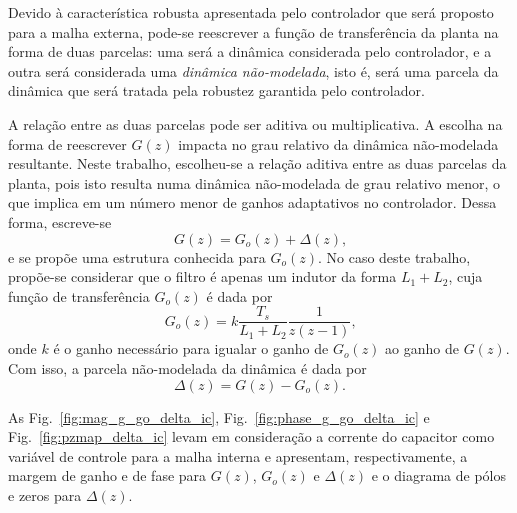   Devido à característica robusta apresentada pelo controlador que será proposto para a malha externa, pode-se reescrever a função de transferência da planta na forma de duas parcelas: uma será a dinâmica considerada pelo controlador, e a outra será considerada uma \emph{dinâmica não-modelada}, isto é, será uma parcela da dinâmica que será tratada pela robustez garantida pelo controlador.

  A relação entre as duas parcelas pode ser aditiva ou multiplicativa. A escolha na forma de reescrever $G(z)$ impacta no grau relativo da dinâmica não-modelada resultante. Neste trabalho, escolheu-se a relação aditiva entre as duas parcelas da planta, pois isto resulta numa dinâmica não-modelada de grau relativo menor, o que implica em um número menor de ganhos adaptativos no controlador. Dessa forma, escreve-se
  \begin{equation}
    G(z) = G_o(z) + \Delta(z) \text{,}
    \label{eq:planta_go_delta_aditiva}
  \end{equation}
  e se propõe uma estrutura conhecida para $G_o(z)$. No caso deste trabalho, propõe-se considerar que o filtro é apenas um indutor da forma $L_1 + L_2$, cuja função de transferência $G_o(z)$ é dada por
  \begin{equation}
    G_o(z) = k \frac{T_s}{L_1+L_2} \frac{1}{z(z-1)} \text{,}
    \label{eq:go_L1_L2}
  \end{equation}
  onde $k$ é o ganho necessário para igualar o ganho de $G_o(z)$ ao ganho de $G(z)$. Com isso, a parcela não-modelada da dinâmica é dada por
  \begin{equation}
    \Delta(z) = G(z) - G_o(z) \text{.}
    \label{eq:dnm_deltaz}
  \end{equation}

  As Fig.~\ref{fig:mag_g_go_delta_ic}, Fig.~\ref{fig:phase_g_go_delta_ic} e Fig.~\ref{fig:pzmap_delta_ic} levam em consideração a corrente do capacitor como variável de controle para a malha interna e apresentam, respectivamente, a margem de ganho e de fase para $G(z)$, $G_o(z)$ e $\Delta(z)$ e o diagrama de pólos e zeros para $\Delta(z)$.

  \vspace{\fill}
  \noindent
  \begin{minipage}{\textwidth}
    \makebox[\textwidth]{
      \centering
      \def\svgwidth{\textwidth}
      }
    \label{fig:mag_g_go_delta_ic}
  \end{minipage}
  \vspace{\fill}

